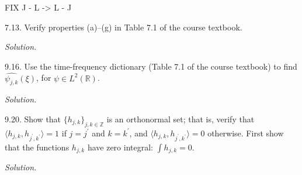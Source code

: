 \documentclass{article}
\newcommand{\R}{\mathbb{R}}
\newcommand{\Z}{\mathbb{Z}}
\begin{document}
FIX J - L -> L - J

\newpage

7.13. Verify properties (a)--(g) in Table 7.1 of the course textbook.

\textit{Solution.}

\newpage

9.16. Use the time-frequency dictionary (Table 7.1 of the course textbook)
to find $\widehat{\psi_{j,k}}(\xi)$, for $\psi \in L^2(\R)$.

\textit{Solution.}

\newpage

9.20. Show that $\{h_{j,k}\}_{j,k \in \Z}$ is an orthonormal set; that is,
verify that $\langle h_{j,k}, h_{j^\prime,k^\prime} \rangle = 1$ if
$j = j^\prime$ and $k = k^\prime$, and
$\langle h_{j,k}, h_{j^\prime,k^\prime} \rangle = 0$ otherwise. First show that
the functions $h_{j,k}$ have zero integral: $\int h_{j,k} = 0$.

\textit{Solution.}
\end{document}
